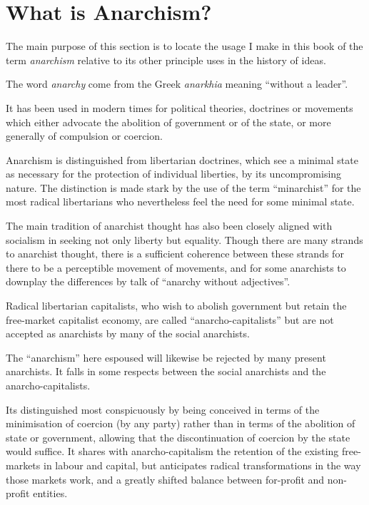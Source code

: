 \section{What is Anarchism?}

The main purpose of this section is to locate the usage I make in this book of the term {\it anarchism} relative to its other principle uses in the history of ideas.

The word {\it anarchy} come from the Greek {\it anarkhia} meaning ``without a leader''.

It has been used in modern times for political theories, doctrines or movements which either advocate the abolition of government or of the state, or more generally of compulsion or coercion.

Anarchism is distinguished from libertarian doctrines, which see a minimal state as necessary for the protection of individual liberties, by its uncompromising nature.
The distinction is made stark by the use of the term ``minarchist'' for the most radical libertarians who nevertheless feel the need for some minimal state.

The main tradition of anarchist thought has also been closely aligned with socialism in seeking not only liberty but equality.
Though there are many strands to anarchist thought, there is a sufficient coherence between these strands for there to be a perceptible movement of movements, and for some anarchists to downplay the differences by talk of ``anarchy without adjectives''.

Radical libertarian capitalists, who wish to abolish government but retain the free-market capitalist economy, are called ``anarcho-capitalists'' but are not accepted as anarchists by many of the social anarchists.

The ``anarchism'' here espoused will likewise be rejected by many present anarchists.
It falls in some respects between the social anarchists and the anarcho-capitalists.

Its distinguished most conspicuously by being conceived in terms of the minimisation of coercion (by any party) rather than in terms of the abolition of state or government, allowing that the discontinuation of coercion by the state would suffice.
It shares with anarcho-capitalism the retention of the existing free-markets in labour and capital, but anticipates radical transformations in the way those markets work, and a greatly shifted balance between for-profit and non-profit entities.
